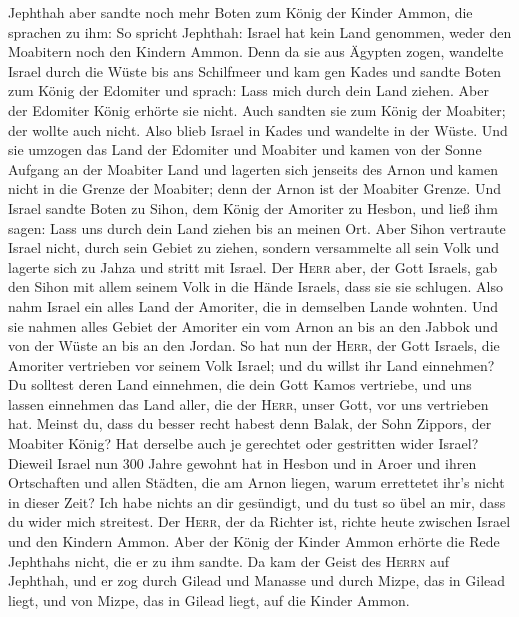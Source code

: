  Jephthah aber sandte noch mehr Boten zum König der
Kinder Ammon,  die sprachen zu ihm: So spricht Jephthah:
Israel hat kein Land genommen, weder den Moabitern noch den Kindern
Ammon.  Denn da sie aus Ägypten zogen, wandelte Israel
durch die Wüste bis ans Schilfmeer und kam gen Kades  und
sandte Boten zum König der Edomiter und sprach: Lass mich durch dein
Land ziehen. Aber der Edomiter König erhörte sie nicht. Auch sandten sie
zum König der Moabiter; der wollte auch nicht. Also blieb Israel in
Kades  und wandelte in der Wüste. Und sie umzogen das
Land der Edomiter und Moabiter und kamen von der Sonne Aufgang an der
Moabiter Land und lagerten sich jenseits des Arnon und kamen nicht in
die Grenze der Moabiter; denn der Arnon ist der Moabiter Grenze.
 Und Israel sandte Boten zu Sihon, dem König der Amoriter
zu Hesbon, und ließ ihm sagen: Lass uns durch dein Land ziehen bis an
meinen Ort.  Aber Sihon vertraute Israel nicht, durch
sein Gebiet zu ziehen, sondern versammelte all sein Volk und lagerte
sich zu Jahza und stritt mit Israel.  Der \textsc{Herr}
aber, der Gott Israels, gab den Sihon mit allem seinem Volk in die Hände
Israels, dass sie sie schlugen. Also nahm Israel ein alles Land der
Amoriter, die in demselben Lande wohnten.  Und sie nahmen
alles Gebiet der Amoriter ein vom Arnon an bis an den Jabbok und von der
Wüste an bis an den Jordan.  So hat nun der
\textsc{Herr}, der Gott Israels, die Amoriter vertrieben vor seinem Volk
Israel; und du willst ihr Land einnehmen?  Du solltest
deren Land einnehmen, die dein Gott Kamos vertriebe, und uns lassen
einnehmen das Land aller, die der \textsc{Herr}, unser Gott, vor uns
vertrieben hat.  Meinst du, dass du besser recht habest
denn Balak, der Sohn Zippors, der Moabiter König? Hat derselbe auch je
gerechtet oder gestritten wider Israel?  Dieweil Israel
nun 300 Jahre gewohnt hat in Hesbon und in Aroer und ihren Ortschaften
und allen Städten, die am Arnon liegen, warum errettetet ihr's nicht in
dieser Zeit?  Ich habe nichts an dir gesündigt, und du
tust so übel an mir, dass du wider mich streitest. Der \textsc{Herr},
der da Richter ist, richte heute zwischen Israel und den Kindern Ammon.
 Aber der König der Kinder Ammon erhörte die Rede
Jephthahs nicht, die er zu ihm sandte.  Da kam der Geist
des \textsc{Herrn} auf Jephthah, und er zog durch Gilead und Manasse und
durch Mizpe, das in Gilead liegt, und von Mizpe, das in Gilead liegt,
auf die Kinder Ammon.

